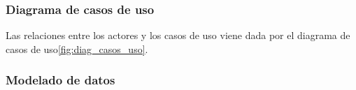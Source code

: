 \subsubsection{Diagrama de casos de uso}
Las relaciones entre los actores y los casos de uso viene dada por el diagrama de casos de uso\ref{fig:diag_casos_uso}.


\subsubsection{Modelado de datos}

